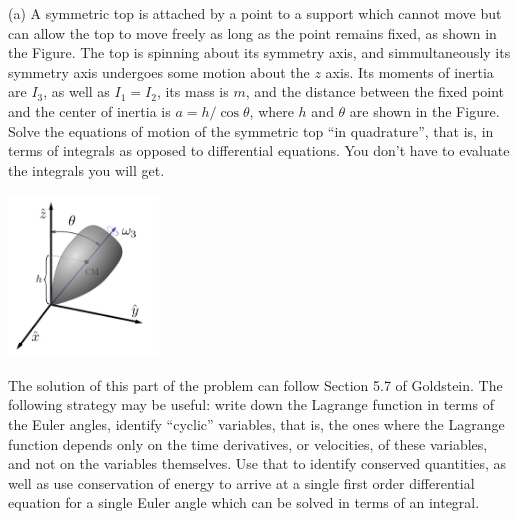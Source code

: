 \documentclass[12pt]{article}
\begin{document}
\begin{problem}{2}
(a) A symmetric top is attached by a point to a support which cannot move but
can allow the top to move freely as long as the point remains fixed, as shown in
the Figure. The top is spinning about its symmetry axis, and simmultaneously its
symmetry axis undergoes some motion about the $z$ axis. Its moments of inertia
are $I_3$, as well as $I_1=I_2$, its mass is $m$, and the distance between the
fixed point and the center of inertia is $a=h /\cos\theta$, where $h$ and
$\theta$ are shown in the Figure. Solve the equations of motion of the symmetric
top ``in quadrature'', that is, in terms of integrals as opposed to differential
equations. You don't have to evaluate the integrals you will get.

\begin{center}
    \includegraphics[width=0.3\textwidth]{hw6_p2.jpg} 
\end{center}

The solution of this part of the problem can follow Section 5.7 of Goldstein.
The following strategy may be useful: write down the Lagrange function in terms
of the Euler angles, identify ``cyclic'' variables, that is, the ones where the
Lagrange function depends only on the time derivatives, or velocities, of these
variables, and not on the variables themselves. Use that to identify conserved
quantities, as well as use conservation of energy to arrive at a single first
order differential equation for a single Euler angle which can be solved in
terms of an integral.


\end{problem}
\end{document}
